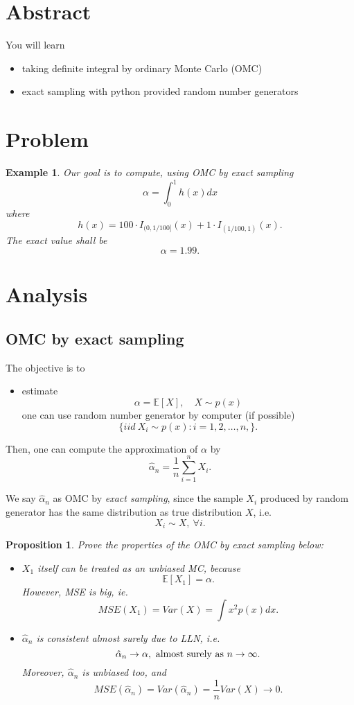 \documentclass{article}
\newtheorem{proposition}[theorem]{Proposition}
\newtheorem{example}{Example}
\begin{document}
\section{Abstract}
You will learn
\begin{itemize}
 \item taking definite integral by ordinary Monte Carlo (OMC)
 \item exact sampling with python provided random number generators
\end{itemize}

\section{Problem}

\begin{example}\label{ex:integral}
Our goal is to compute, using OMC by exact sampling
$$\alpha = \int_0^1 h(x) dx$$
where
$$h(x) = 100 \cdot I_{(0, 1/100]}(x) + 1\cdot I_{(1/100, 1)} (x).$$
The exact value shall be 
$$\alpha = 1.99.$$
\end{example}

\section{Analysis}

\subsection{OMC by exact sampling}
The objective is to 
\begin{itemize}
 \item estimate 
$$\alpha = \mathbb E[X], \quad X \sim p(x)$$
one can use random number generator by computer (if possible)
$$\{iid \ X_i \sim p(x): i = 1, 2, \ldots, n, \} .$$
\end{itemize}

Then, one can compute the approximation of $\alpha$ by
$$\hat \alpha_n = \frac 1 n \sum_{i=1}^n X_i.$$

We say $\hat \alpha_n$ as OMC by {\it exact sampling}, since the sample $X_i$
produced by random generator has the same distribution as true distribution $X$, 
i.e. 
$$X_i \sim X, \ \forall i.$$

 

\begin{proposition}
Prove the  properties of the OMC by exact sampling below:
\begin{itemize}
 \item $X_1$ itself can be treated as an unbiased MC, because
 $$\mathbb E [X_1] = \alpha.$$
 However, MSE is big, ie.
 $$MSE(X_1) = Var(X) = \int x^2 p(x) dx.$$
 \item $\hat \alpha_n$ is {\it consistent almost surely} due to LLN, i.e.
 $$\hat \alpha_n \to \alpha, \hbox{ almost surely as } n\to \infty.$$
 Moreover, $\hat \alpha_n$ is unbiased too, and
 $$MSE(\hat \alpha_n) = Var(\hat \alpha_n) = \frac 1 n Var(X) \to 0.$$
\end{itemize}
\end{proposition}
\end{document}

